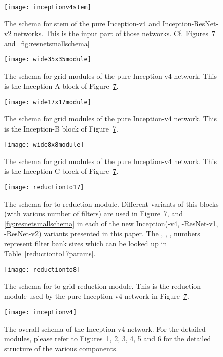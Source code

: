 \documentclass[10pt,twocolumn,letterpaper]{article}
\begin{document}
\begin{figure}
\centering
\texttt{[image: inceptionv4stem]}
\caption{The schema for stem of the pure Inception-v4 and
  Inception-ResNet-v2 networks. This is the input part of those
networks. Cf. Figures~\ref{fig:inceptionv4} and~\ref{fig:resnetsmallschema} }
\label{fig:inceptionv4stem}
\end{figure}
\begin{figure}
\centering
\texttt{[image: wide35x35module]}
\caption{The schema for  grid modules of the pure Inception-v4
 network. This is the Inception-A block of Figure~\ref{fig:inceptionv4}. }
\label{fig:wide35x35module}
\end{figure}
\begin{figure}
\centering
\texttt{[image: wide17x17module]}
\caption{The schema for  grid modules of the pure Inception-v4
 network. This is the Inception-B block of Figure~\ref{fig:inceptionv4}.}
\label{fig:wide17x17module}
\end{figure}
\begin{figure}
\centering
\texttt{[image: wide8x8module]}
\caption{The schema for  grid modules of the pure Inception-v4
 network. This is the Inception-C block of Figure~\ref{fig:inceptionv4}.}
\label{fig:wide8x8module}
\end{figure}
\begin{figure}
\centering
\texttt{[image: reductionto17]}
\caption{The schema for  to  reduction module.
  Different variants of this blocks (with various number of filters) are
  used in Figure~\ref{fig:inceptionv4}, and \ref{fig:resnetsmallschema}
  in each of the new Inception(-v4, -ResNet-v1, -ResNet-v2) variants
  presented in this paper. The , , ,  numbers represent
  filter bank sizes which can be looked up in Table~\ref{reductionto17params}.
}
\label{fig:reductionto17}
\end{figure}
\begin{figure}
\centering
\texttt{[image: reductionto8]}
\caption{The schema for  to  grid-reduction module.
  This is the reduction module used by the pure Inception-v4 network in
  Figure~\ref{fig:inceptionv4}.
}
\label{fig:reductionto8}
\end{figure}
\begin{figure}
\centering
\texttt{[image: inceptionv4]}
\caption{The overall schema of the Inception-v4 network. For the
  detailed modules, please refer to Figures~\ref{fig:inceptionv4stem},
  \ref{fig:wide35x35module}, \ref{fig:wide17x17module}, \ref{fig:wide8x8module},
  \ref{fig:reductionto17} and \ref{fig:reductionto8} for the detailed structure
  of the various components.
}
\label{fig:inceptionv4}
\end{figure}
\end{document}
